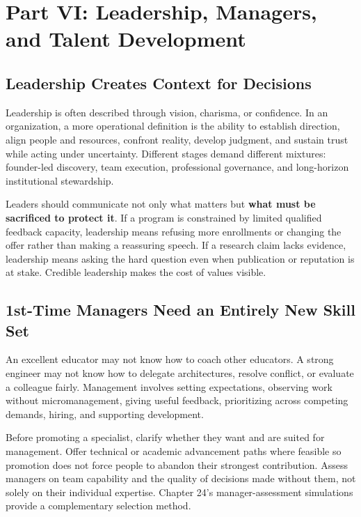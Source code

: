 \section*{Part VI: Leadership, Managers, and Talent Development}

\subsection{Leadership Creates Context for Decisions}
\label{sec:leadership_context_decisions}

Leadership is often described through vision, charisma, or confidence. In an organization, a more operational definition is the ability to establish direction, align people and resources, confront reality, develop judgment, and sustain trust while acting under uncertainty. Different stages demand different mixtures: founder-led discovery, team execution, professional governance, and long-horizon institutional stewardship.

Leaders should communicate not only what matters but \textbf{what must be sacrificed to protect it}. If a program is constrained by limited qualified feedback capacity, leadership means refusing more enrollments or changing the offer rather than making a reassuring speech. If a research claim lacks evidence, leadership means asking the hard question even when publication or reputation is at stake. Credible leadership makes the cost of values visible.

\subsection{1st-Time Managers Need an Entirely New Skill Set}
\label{sec:first_time_managers}

An excellent educator may not know how to coach other educators. A strong engineer may not know how to delegate architectures, resolve conflict, or evaluate a colleague fairly. Management involves setting expectations, observing work without micromanagement, giving useful feedback, prioritizing across competing demands, hiring, and supporting development.

Before promoting a specialist, clarify whether they want and are suited for management. Offer technical or academic advancement paths where feasible so promotion does not force people to abandon their strongest contribution. Assess managers on team capability and the quality of decisions made without them, not solely on their individual expertise. Chapter 24's manager-assessment simulations provide a complementary selection method.


